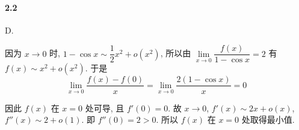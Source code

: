 \paragraph*{2.2} D.

因为 $x\to 0$ 时, $1-\cos x\sim\dfrac{1}{2}x^2+o\left(x^2\right)$, 所以由 $\lim\limits_{x\to 0}\dfrac{f(x)}{1-\cos x}=2$ 有 $f(x)\sim x^2+o\left(x^2\right)$. 于是
\[
	\lim_{x\to 0}\dfrac{f(x)-f(0)}{x}=\lim_{x\to 0}\dfrac{2(1-\cos x)}{x}=0
\]

因此 $f(x)$ 在 $x=0$ 处可导, 且 $f'(0)=0$. 故 $x\to 0$, $f'(x)\sim 2x+o(x)$, $f''(x)\sim 2+o(1)$. 即 $f''(0)=2>0$. 所以 $f(x)$ 在 $x=0$ 处取得最小值.
